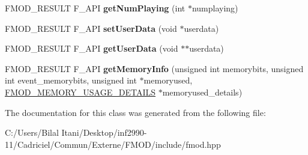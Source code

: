 \begin{DoxyCompactItemize}
\item 
F\+M\+O\+D\+\_\+\+R\+E\+S\+U\+LT F\+\_\+\+A\+PI {\bfseries get\+Num\+Playing} (int $\ast$numplaying)\hypertarget{class_f_m_o_d_1_1_sound_group_af88057e101e4dd2268d1a6f6656db75b}{}\label{class_f_m_o_d_1_1_sound_group_af88057e101e4dd2268d1a6f6656db75b}

\item 
F\+M\+O\+D\+\_\+\+R\+E\+S\+U\+LT F\+\_\+\+A\+PI {\bfseries set\+User\+Data} (void $\ast$userdata)\hypertarget{class_f_m_o_d_1_1_sound_group_a3315678b522baf2d74f732ab671f48c7}{}\label{class_f_m_o_d_1_1_sound_group_a3315678b522baf2d74f732ab671f48c7}

\item 
F\+M\+O\+D\+\_\+\+R\+E\+S\+U\+LT F\+\_\+\+A\+PI {\bfseries get\+User\+Data} (void $\ast$$\ast$userdata)\hypertarget{class_f_m_o_d_1_1_sound_group_ac428e826a819030cbab7ffa666d7d9cd}{}\label{class_f_m_o_d_1_1_sound_group_ac428e826a819030cbab7ffa666d7d9cd}

\item 
F\+M\+O\+D\+\_\+\+R\+E\+S\+U\+LT F\+\_\+\+A\+PI {\bfseries get\+Memory\+Info} (unsigned int memorybits, unsigned int event\+\_\+memorybits, unsigned int $\ast$memoryused, \hyperlink{struct_f_m_o_d___m_e_m_o_r_y___u_s_a_g_e___d_e_t_a_i_l_s}{F\+M\+O\+D\+\_\+\+M\+E\+M\+O\+R\+Y\+\_\+\+U\+S\+A\+G\+E\+\_\+\+D\+E\+T\+A\+I\+LS} $\ast$memoryused\+\_\+details)\hypertarget{class_f_m_o_d_1_1_sound_group_aab478a5f6edb8ef0eaf8d8fc70d1a448}{}\label{class_f_m_o_d_1_1_sound_group_aab478a5f6edb8ef0eaf8d8fc70d1a448}

\end{DoxyCompactItemize}


The documentation for this class was generated from the following file\+:\begin{DoxyCompactItemize}
\item 
C\+:/\+Users/\+Bilal Itani/\+Desktop/inf2990-\/11/\+Cadriciel/\+Commun/\+Externe/\+F\+M\+O\+D/include/fmod.\+hpp\end{DoxyCompactItemize}
